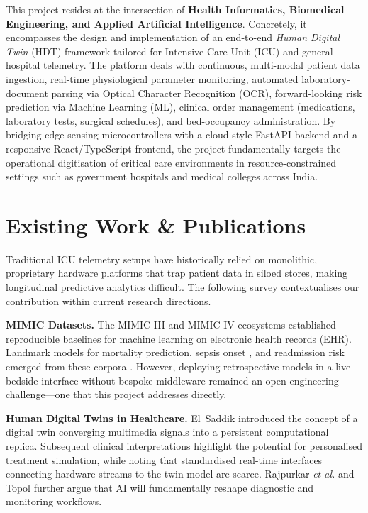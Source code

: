 \documentclass[12pt,a4paper]{article}
\begin{document}
This project resides at the intersection of \textbf{Health Informatics, Biomedical Engineering,
and Applied Artificial Intelligence}. Concretely, it encompasses the design and
implementation of an end-to-end \textit{Human Digital Twin} (HDT) framework tailored
for Intensive Care Unit (ICU) and general hospital telemetry. The platform deals with
continuous, multi-modal patient data ingestion, real-time physiological parameter
monitoring, automated laboratory-document parsing via Optical Character Recognition
(OCR), forward-looking risk prediction via Machine Learning (ML), clinical order
management (medications, laboratory tests, surgical schedules), and bed-occupancy
administration. By bridging edge-sensing microcontrollers with a cloud-style FastAPI
backend and a responsive React/TypeScript frontend, the project fundamentally targets
the operational digitisation of critical care environments in resource-constrained
settings such as government hospitals and medical colleges across India.

\section{Existing Work \& Publications}

Traditional ICU telemetry setups have historically relied on monolithic, proprietary
hardware platforms that trap patient data in siloed stores, making longitudinal
predictive analytics difficult. The following survey contextualises our contribution
within current research directions.

\textbf{MIMIC Datasets.}  The MIMIC-III \cite{johnson2016} and MIMIC-IV \cite{johnson2023} ecosystems established reproducible baselines for machine learning on electronic health records (EHR). Landmark models for mortality prediction, sepsis onset \cite{reyna2020}, and readmission risk emerged from these corpora \cite{celi2020}. However, deploying retrospective models in a live bedside interface without bespoke middleware remained an open engineering challenge—one that this project addresses directly.

\textbf{Human Digital Twins in Healthcare.}  El~Saddik \cite{elsaddik2018} introduced the concept of a digital twin converging multimedia signals into a persistent computational replica. Subsequent clinical interpretations \cite{bjornsson2019} highlight the potential for personalised treatment simulation, while noting that standardised real-time interfaces connecting hardware streams to the twin model are scarce. Rajpurkar \textit{et al.} \cite{rajpurkar2022} and Topol \cite{topol2019} further argue that AI will fundamentally reshape diagnostic and monitoring workflows.
\end{document}
